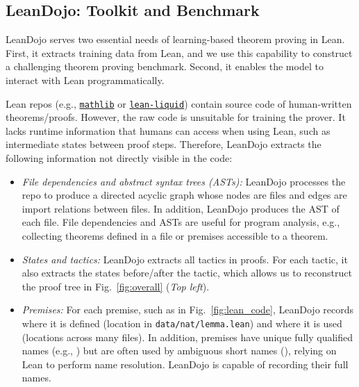 \subsection{LeanDojo: Toolkit and Benchmark}
\label{sec:leandojo}

LeanDojo serves two essential needs of learning-based theorem proving in Lean. First, it extracts training data from Lean, and we use this capability to construct a challenging theorem proving benchmark. Second, it enables the model to interact with Lean programmatically.

Lean repos (e.g., \href{https://github.com/leanprover-community/mathlib}{\texttt{mathlib}} or \href{https://github.com/leanprover-community/lean-liquid}{\texttt{lean-liquid}}) contain source code of human-written theorems/proofs. However, the raw code is unsuitable for training the prover. It lacks runtime information that humans can access when using Lean, such as intermediate states between proof steps. Therefore, LeanDojo extracts the following information not directly visible in the code:
\begin{itemize}

\item \emph{File dependencies and abstract syntax trees (ASTs):} LeanDojo processes the repo to produce a directed acyclic graph whose nodes are files and edges are import relations between files. In addition, LeanDojo produces the AST of each file. File dependencies and ASTs are useful for program analysis, e.g., collecting theorems defined in a file or premises accessible to a theorem.

\item \emph{States and tactics:} LeanDojo extracts all tactics in proofs. For each tactic, it also extracts the states before/after the tactic, which allows us to reconstruct the proof tree in Fig.~\ref{fig:overall} (\emph{Top left}).

\item \emph{Premises:} For each premise, such as  in Fig.~\ref{fig:lean_code}, LeanDojo records where it is defined (location in \texttt{data/nat/lemma.lean}) and where it is used (locations across many files). In addition, premises have unique fully qualified names (e.g., ) but are often used by ambiguous short names (), relying on Lean to perform name resolution. LeanDojo is capable of recording their full names.
\end{itemize}

